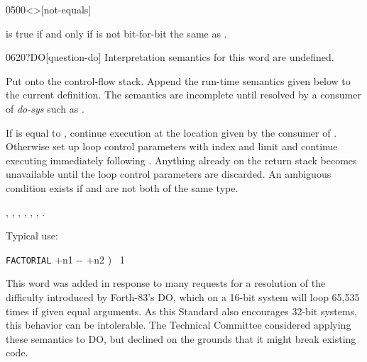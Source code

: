 \begin{worddef}[ne]{0500}{<>}[not-equals]
\item {}

	 is true if and only if  is not bit-for-bit
	the same as .
\end{worddef}


\begin{worddef}[qDO]{0620}{?DO}[question-do]
\interpret
	Interpretation semantics for this word are undefined.

\compile

	Put  onto the control-flow stack. Append the
	run-time semantics given below to the current definition. The
	semantics are incomplete until resolved by a consumer of
	\emph{do-sys} such as .

\runtime

	If  is equal to , continue
	execution at the location given by the consumer of
	. Otherwise set up loop control parameters with
	index  and limit  and continue
	executing immediately following . Anything already
	on the return stack becomes unavailable until the loop
	control parameters are discarded. An ambiguous condition
	exists if  and  are not both of
	the same type.

\see {},
	,
	,
	,
	,
	,
	.

	\begin{defer}
	\rationale %
		Typical use:

		\tab \word{:} \texttt{FACTORIAL}  +n1 -{}- +n2 )~
			1   ~
				 \word{*}~
		\word{;}

		This word was added in response to many requests for a
		resolution of the difficulty introduced by Forth-83's DO,
		which on a 16-bit system will loop 65,535 times if given
		equal arguments. As this Standard also encourages 32-bit
		systems, this behavior can be intolerable. The Technical
		Committee considered applying these semantics to DO, but
		declined on the grounds that it might break existing code.
	\end{defer}
\end{worddef}


